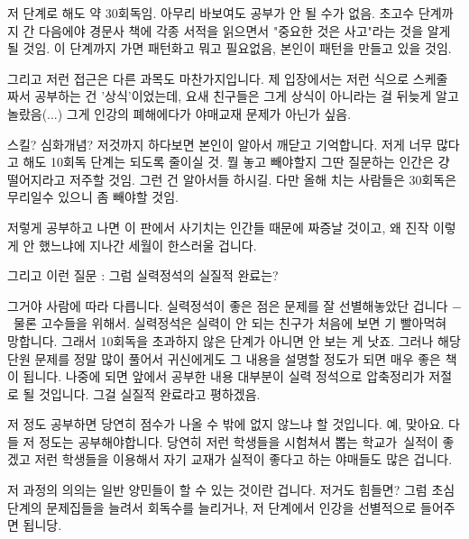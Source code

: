 저 단계로 해도 약 30회독임. 아무리 바보여도 공부가 안 될 수가 없음.
초고수 단계까지 간 다음에야 경문사 책에 각종 서적을 읽으면서 "중요한 것은 사고"라는 것을 알게 될 것임.
이 단계까지 가면 패턴화고 뭐고 필요없음, 본인이 패턴을 만들고 있을 것임.
\vspace{5mm}

그리고 저런 접근은 다른 과목도 마찬가지입니다.
제 입장에서는 저런 식으로 스케줄 짜서 공부하는 건 '상식'이었는데, 요새 친구들은 그게 상식이 아니라는 걸 뒤늦게 알고 놀랐음(...)
그게 인강의 폐해에다가 야매교재 문제가 아닌가 싶음.
\vspace{5mm}

스킬? 심화개념?
저것까지 하다보면 본인이 알아서 깨닫고 기억합니다.
저게 너무 많다고 해도 10회독 단계는 되도록 줄이실 것. 뭘 놓고 빼야할지 그딴 질문하는 인간은 걍 떨어지라고 저주할 것임.
그런 건 알아서들 하시길. 다만 올해 치는 사람들은 30회독은 무리일수 있으니 좀 빼야할 것임.
\vspace{5mm}

저렇게 공부하고 나면 이 판에서 사기치는 인간들 때문에 짜증날 것이고, 왜 진작 이렇게 안 했느냐에 지나간 세월이 한스러울 겁니다.
\vspace{5mm}

그리고 이런 질문 : 그럼 실력정석의 실질적 완료는?
\vspace{5mm}

그거야 사람에 따라 다릅니다. 실력정석이 좋은 점은 문제를 잘 선별해놓았단 겁니다 $-$ 물론 고수들을 위해서.
실력정석은 실력이 안 되는 친구가 처음에 보면 기 빨아먹혀 망합니다. 그래서 10회독을 초과하지 않은 단계가 아니면 안 보는 게 낫죠.
그러나 해당 단원 문제를 정말 많이 풀어서 귀신에게도 그 내용을 설명할 정도가 되면 매우 좋은 책이 됩니다.
나중에 되면 앞에서 공부한 내용 대부분이 실력 정석으로 압축정리가 저절로 될 것입니다. 그걸 실질적 완료라고 평하겠음.
\vspace{5mm}

저 정도 공부하면 당연히 점수가 나올 수 밖에 없지 않느냐 할 것입니다. 예, 맞아요. 다들 저 정도는 공부해야합니다.
당연히 저런 학생들을 시험쳐서 뽑는 학교가 실적이 좋겠고
저런 학생들을 이용해서 자기 교재가 실적이 좋다고 하는 야매들도 많은 겁니다.
\vspace{5mm}

저 과정의 의의는 일반 양민들이 할 수 있는 것이란 겁니다. 저거도 힘들면?
그럼 초심 단계의 문제집들을 늘려서 회독수를 늘리거나, 저 단계에서 인강을 선별적으로 들어주면 됩니당.
\vspace{5mm}







